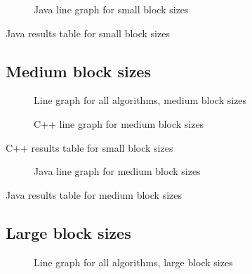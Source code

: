 \begin{figure}
    \centering
    
    \caption{Java line graph for small block sizes}
    \label{fig:java:line:small}
\end{figure}
\begin{table}
    \centering
    \caption{Java results table for small block sizes}
    \label{tab:java:small}
    \resizebox{\columnwidth}{!}{
        
    }
\end{table}

\subsection{Medium block sizes}
\begin{figure}
    \centering
    
    \caption{Line graph for all algorithms, medium block sizes}
    \label{fig:all:line:medium}
\end{figure}

\begin{figure}
    \centering
    
    \caption{C++ line graph for medium block sizes}
    \label{fig:cpp:line:medium}
\end{figure}
\begin{table}
    \centering
    \caption{C++ results table for small block sizes}
    \label{tab:cpp:medium}
    \resizebox{\columnwidth}{!}{
        
    }
\end{table}


\begin{figure}
    \centering
    
    \caption{Java line graph for medium block sizes}
    \label{fig:java:line:medium}
\end{figure}
\begin{table}
    \centering
    \caption{Java results table for medium block sizes}
    \label{tab:java:medium}
    
\end{table}

\subsection{Large block sizes}

\begin{figure}
    \centering
    
    \caption{Line graph for all algorithms, large block sizes}
    \label{fig:all:line:large}
\end{figure}

